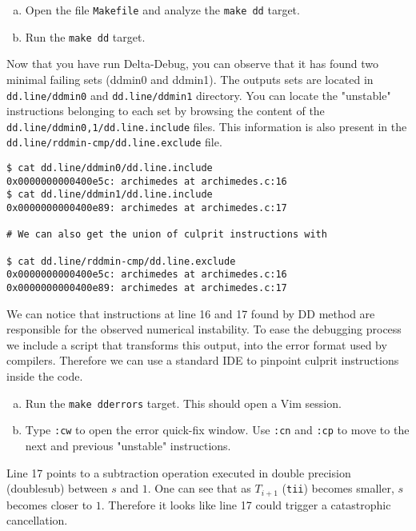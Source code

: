 \begin{question}
  \begin{enumerate}[(a)]
    \item Open the file \texttt{Makefile} and analyze the \texttt{make dd} target.
    \item Run the \texttt{make dd} target.
  \end{enumerate}
\end{question}

Now that you have run Delta-Debug, you can observe that it has found two minimal failing sets (ddmin0 and ddmin1). The outputs sets are located in \texttt{dd.line/ddmin0} and \texttt{dd.line/ddmin1} directory. You can locate the "unstable" instructions belonging to each set by browsing the content of the \texttt{dd.line/ddmin{0,1}/dd.line.include} files. This information is also present in the \texttt{dd.line/rddmin-cmp/dd.line.exclude} file.

\begin{verbatim}
$ cat dd.line/ddmin0/dd.line.include
0x0000000000400e5c: archimedes at archimedes.c:16
$ cat dd.line/ddmin1/dd.line.include
0x0000000000400e89: archimedes at archimedes.c:17

# We can also get the union of culprit instructions with

$ cat dd.line/rddmin-cmp/dd.line.exclude
0x0000000000400e5c: archimedes at archimedes.c:16
0x0000000000400e89: archimedes at archimedes.c:17
\end{verbatim}

We can notice that instructions at line 16 and 17 found by DD method are responsible for the observed numerical instability. To ease the debugging process we include a script that transforms this output, into the error format used by compilers. Therefore we can use a standard IDE to pinpoint culprit instructions inside the code.

\begin{question}
  \begin{enumerate}[(a)]
    \item Run the \texttt{make dderrors} target. This should open a Vim session.
    \item Type \texttt{:cw} to open the error quick-fix window. Use \texttt{:cn} and \texttt{:cp} to move to the next and previous "unstable" instructions.
  \end{enumerate}
\end{question}

Line 17 points to a subtraction operation executed in double precision (doublesub) between $s$ and $1$. One can see that as $T_{i+1}$ (\texttt{tii}) becomes smaller, $s$ becomes closer to $1$. Therefore it looks like line 17 could trigger a catastrophic cancellation.

